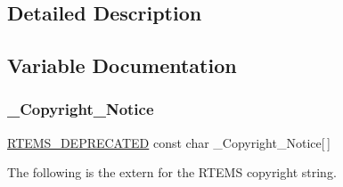 \subsection{Detailed Description}


\subsection{Variable Documentation}
\mbox{\label{group__RTEMSScoreSystem_ga8c1d8c81c301e447ff5c3060cbbfb01c}} 
\subsubsection{\texorpdfstring{\_Copyright\_Notice}{\_Copyright\_Notice}}
{\footnotesize\ttfamily \mbox{\hyperlink{group__RTEMSScoreBaseDefs_gab651a076d4d51d50221e7ef7ac99d4e7}{R\+T\+E\+M\+S\+\_\+\+D\+E\+P\+R\+E\+C\+A\+T\+ED}} const char \+\_\+\+Copyright\+\_\+\+Notice\mbox{[}$\,$\mbox{]}}

The following is the extern for the R\+T\+E\+MS copyright string. 